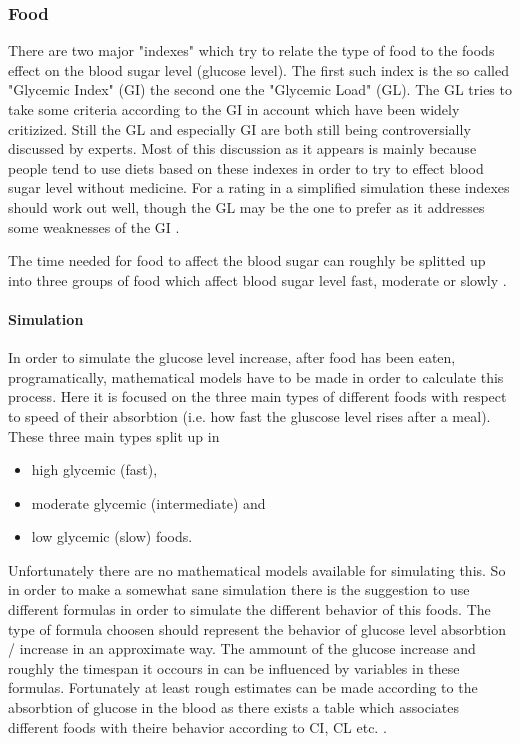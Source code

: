 \newpage
\subsubsection{Food}
There are two major "indexes" which try to relate the type of food to the foods effect on the blood sugar level (glucose level).
The first such index is the so called "Glycemic Index" (GI) the second one the "Glycemic Load" (GL).
The GL tries to take some criteria according to the GI in account which have been widely critizized.
Still the GL and especially GI are both still being controversially discussed by experts.
Most of this discussion as it appears is mainly because people tend to use
diets based on these indexes in order to try to effect blood sugar level
without medicine. For a rating in a simplified simulation these indexes should
work out well, though the GL may be the one to prefer as it addresses some
weaknesses of the GI \cite{norden:glycemicindex}.

The time needed for food to affect the blood sugar can roughly be splitted up
into three groups of food which affect blood sugar level fast, moderate or
slowly \cite{mit:glycemicindex}.

\paragraph{Simulation}
In order to simulate the glucose level increase, after food has been eaten, programatically, mathematical models have to be made in order to calculate this process.
Here it is focused on the three main types of different foods with respect to speed of their absorbtion (i.e. how fast the gluscose level rises after a meal).
These three main types split up in

\begin{itemize}
  \item high glycemic (fast),
  \item moderate glycemic (intermediate) and
  \item low glycemic (slow) foods.
\end{itemize}

Unfortunately there are no mathematical models available for simulating this.
So in order to make a somewhat sane simulation there is the suggestion to use different formulas in order to simulate the different behavior of this foods.
The type of formula choosen should represent the behavior of glucose level absorbtion / increase in an approximate way.
The ammount of the glucose increase and roughly the timespan it occours in can be influenced by variables in these formulas.
Fortunately at least rough estimates can be made according to the absorbtion of
glucose in the blood as there exists a table which associates different foods
with theire behavior according to CI, CL etc. \cite{glycemicindex:table}.

